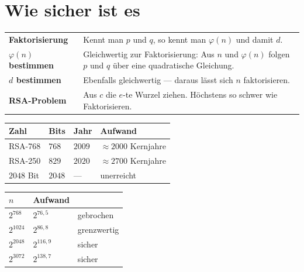 \section{Wie sicher ist es}

\begin{merksatz}
\begin{center}
{\small
\renewcommand{\arraystretch}{1.52}
\begin{tabular}{@{}P{2.8cm}P{5.8cm}@{}}
\toprule
\textbf{Faktorisierung} & Kennt man $p$ und $q$, so kennt man $\varphi(n)$ und damit $d$.\\
\textbf{$\varphi(n)$ bestimmen} & Gleichwertig zur Faktorisierung: Aus $n$ und $\varphi(n)$ folgen $p$ und $q$ über eine quadratische Gleichung.\\
\textbf{$d$ bestimmen} & Ebenfalls gleichwertig --- daraus lässt sich $n$ faktorisieren.\\
\textbf{RSA-Problem} & Aus $c$ die $e$-te Wurzel ziehen. \textcolor{mittel}{Höchstens} so schwer wie Faktorisieren.\\
\bottomrule
\end{tabular}}
\end{center}

\begin{center}
\begin{minipage}{0.88\textwidth}
\end{minipage}
\end{center}

\begin{center}
{\small
\renewcommand{\arraystretch}{1.48}
\begin{tabular}{@{}P{2.2cm}P{1.8cm}P{2.0cm}P{2.0cm}@{}}
\toprule
\textbf{Zahl} & \textbf{Bits} & \textbf{Jahr} & \textbf{Aufwand}\\
\midrule
RSA-768 & $768$ & $2009$ & $\approx2000$ Kernjahre\\
RSA-250 & $829$ & $2020$ & $\approx2700$ Kernjahre\\
$2048$ Bit & $2048$ & --- & \textcolor{gruen}{unerreicht}\\
\bottomrule
\end{tabular}}
\end{center}

\begin{center}
{\small
\renewcommand{\arraystretch}{1.48}
\begin{tabular}{@{}P{2.2cm}P{2.2cm}P{2.8cm}@{}}
\toprule
$n$ & \textbf{Aufwand} & \\
\midrule
$2^{768}$ & $2^{76{,}5}$ & gebrochen\\
$2^{1024}$ & $2^{86{,}8}$ & \textcolor{mittel}{grenzwertig}\\
$2^{2048}$ & $2^{116{,}9}$ & sicher\\
$2^{3072}$ & $2^{138{,}7}$ & sicher\\
\bottomrule
\end{tabular}}
\end{center}


\end{merksatz}
